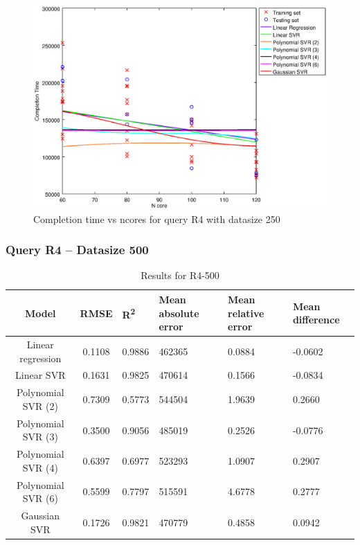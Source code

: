 \documentclass[a4paper,11pt]{article}
\begin{document}
\begin {figure}[hbtp]
\centering
\includegraphics[width=\textwidth]{output/R4_250_LINEAR_NCORE/plot_R4_250.eps}
\caption{Completion time vs ncores for query R4 with datasize 250}
\label{fig:all_linear_R4_250}
\end {figure}

\newpage
\subsubsection{Query R4 -- Datasize 500}
\begin{table}[H]
	\centering
	\begin{adjustbox}{center}
		\begin{tabular}{c | c M{1.2cm} M{2.5cm} M{2.5cm} M{1.8cm}}
			Model & RMSE & R\textsuperscript{2} & Mean absolute error & Mean relative error & Mean difference \tabularnewline
			\hline
			Linear regression & 0.1108 & 0.9886 & 462365 & 0.0884 & -0.0602 \\
			Linear SVR & 0.1631 & 0.9825 & 470614 & 0.1566 & -0.0834 \\
			Polynomial SVR (2) & 0.7309 & 0.5773 & 544504 & 1.9639 & 0.2660 \\
			Polynomial SVR (3) & 0.3500 & 0.9056 & 485019 & 0.2526 & -0.0776 \\
			Polynomial SVR (4) & 0.6397 & 0.6977 & 523293 & 1.0907 & 0.2907 \\
			Polynomial SVR (6) & 0.5599 & 0.7797 & 515591 & 4.6778 & 0.2777 \\
			Gaussian SVR & 0.1726 & 0.9821 & 470779 & 0.4858 & 0.0942 \\
		\end{tabular}
	\end{adjustbox}
	\\
	\caption{Results for R4-500}
	\label{fig:all_linear_R4_500}
\end{table}
\end{document}
